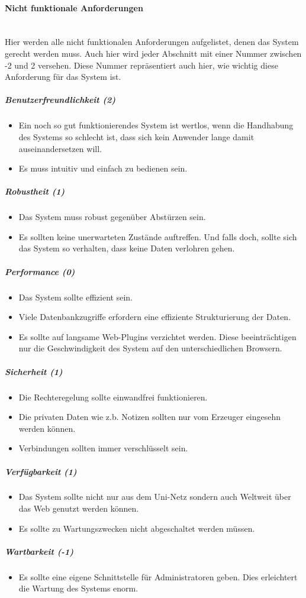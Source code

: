 \documentclass[12pt,a4paper]{article}
\begin{document}
\paragraph{Nicht funktionale Anforderungen}\mbox{}\\
Hier werden alle nicht funktionalen Anforderungen aufgelistet, denen das System gerecht werden muss. Auch hier wird jeder Abschnitt mit einer Nummer zwischen -2 und 2 versehen. Diese Nummer repräsentiert auch hier, wie wichtig diese Anforderung für das System ist.
\subparagraph{Benutzerfreundlichkeit (2)}
\begin{itemize}
\item Ein noch so gut funktionierendes System ist wertlos, wenn die Handhabung des Systems so schlecht ist, dass sich kein Anwender lange damit auseinandersetzen will. 
\item Es muss intuitiv und einfach zu bedienen sein.
\end{itemize}
\subparagraph{Robustheit (1)}
\begin{itemize}
\item Das System muss robust gegenüber Abstürzen sein. 
\item Es sollten keine unerwarteten Zustände auftreffen. Und falls doch, sollte sich das System so verhalten, dass keine Daten verlohren gehen.
\end{itemize}
\subparagraph{Performance (0)}
\begin{itemize}
\item Das System sollte effizient sein.
\item Viele Datenbankzugriffe erfordern eine effiziente Strukturierung der Daten.
\item Es sollte auf langsame Web-Plugins verzichtet werden. Diese beeinträchtigen nur die Geschwindigkeit des System auf den unterschiedlichen Browsern.
\end{itemize}
\subparagraph{Sicherheit (1)}
\begin{itemize}
\item Die Rechteregelung sollte einwandfrei funktionieren.
\item Die privaten Daten wie z.b. Notizen sollten nur vom Erzeuger eingesehn werden können.
\item Verbindungen sollten immer verschlüsselt sein.
\end{itemize}
\subparagraph{Verfügbarkeit (1)}
\begin{itemize}
\item Das System sollte nicht nur aus dem Uni-Netz sondern auch Weltweit über das Web genutzt werden können.
\item Es sollte zu Wartungszwecken nicht abgeschaltet werden müssen.
\end{itemize}
\subparagraph{Wartbarkeit (-1)}
\begin{itemize}
\item Es sollte eine eigene Schnittstelle für Administratoren geben. Dies erleichtert die Wartung des Systems enorm.
\end{itemize}
\end{document}
